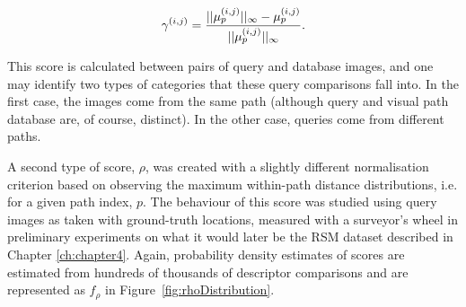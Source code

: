 \begin{equation}
\centering
\gamma^{(i,j)} = \frac{||\mu^{(i,j)}_p||_{\infty}-\mu^{(i,j)}_p}{||\mu^{(i,j)}_p||_{\infty}}.
\end{equation}

This score is calculated between pairs of query and database images, and one may identify two types of categories that these query comparisons fall into.  In the first case, the images come from the same path (although query and visual path database are, of course, distinct).  In the other case, queries come from different paths. %

 



A second type of score, $\rho$, was created with a slightly different normalisation criterion based on observing the maximum within-path distance distributions, i.e. for a given path index, $p$.  The behaviour of this score was studied using query images as taken with ground-truth locations, measured with a surveyor's wheel in preliminary experiments on what it would later be the RSM dataset described in Chapter \ref{ch:chapter4}. Again, probability density estimates of scores are estimated from hundreds of thousands of descriptor comparisons and are represented as $f_\rho$ in Figure~\ref{fig:rhoDistribution}.


